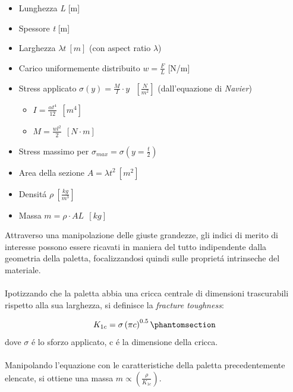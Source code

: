 \documentclass{article}
\begin{document}
        \begin{itemize}
            \item Lunghezza \textit{L} [m]
            \item Spessore \textit{t} [m]
            \item Larghezza $\lambda t \ [m]$ (con aspect ratio $\lambda$)
            \item Carico uniformemente distribuito $w = \frac{F}{L}$ [N/m]
            \item Stress applicato $\sigma(y) = \frac{M}{I} \cdot y \ \ \ [\frac{N}{m^2}]$ (dall'equazione di \textit{Navier})
                \begin{itemize}
                    \item $I = \frac{\alpha t^4}{12} \ \ [m^4]$ 
                    \item $M = \frac{wl^2}{2} \ \ [N \cdot m]$
                \end{itemize}
            \item Stress massimo per $\sigma_{max} = \sigma(y = \frac{t}{2})$
            \item Area della sezione $A = \lambda t^2 \ [m^2]$
            \item Densitá $\rho \ [\frac{kg}{m^3}]$
            \item Massa $m = \rho \cdot AL \ \ [kg]$
        \end{itemize}

        Attraverso una manipolazione delle giuste grandezze, gli indici di merito di interesse possono essere ricavati 
        in maniera del tutto indipendente dalla geometria della paletta, focalizzandosi quindi
        sulle proprietá intrinseche del materiale.
        \\ \\ 
        Ipotizzando che la paletta abbia una cricca centrale di dimensioni trascurabili
        rispetto alla sua larghezza, si definisce la \textit{fracture toughness}:

        \begin{equation}
            K_{1c} = \sigma\left(\pi c\right)^{0.5} 
            \phantomsection \label{equation:frac_tough}
        \end{equation}
        dove $\sigma$ é lo sforzo applicato, c é la dimensione della cricca. \\ \\ 

        Manipolando l'equazione con le caratteristiche della paletta precedentemente
        elencate, si ottiene una massa $m \propto \left(\frac{\rho}{K_{1c}}\right) $.
\end{document}
